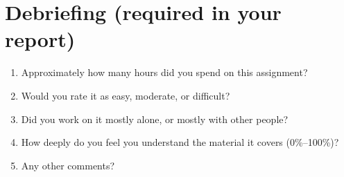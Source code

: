 \documentclass[11pt]{article}
\begin{document}




{%
\section*{Debriefing (required in your report)}
\begin{enumerate}
\item Approximately how many hours did you spend on this assignment?
\item Would you rate it as easy, moderate, or difficult?
\item Did you work on it mostly alone, or mostly with other people?
\item How deeply do you feel you understand the material it covers (0\%--100\%)?
\item Any other comments?
\end{enumerate}
}
\end{document}
